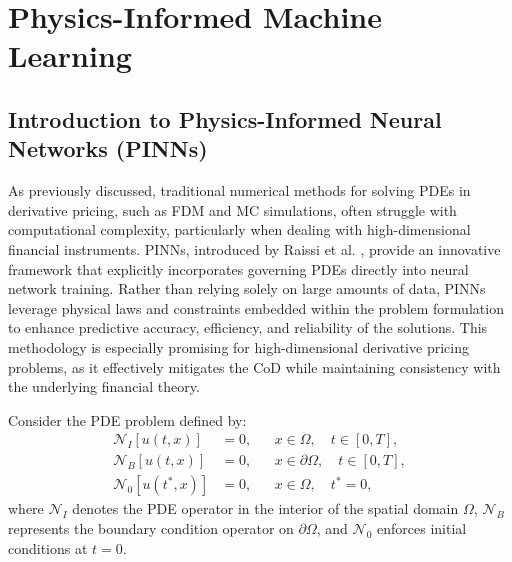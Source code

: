 \documentclass[12pt]{report} %
\theoremstyle{plain}           %
\theoremstyle{definition}      %
\theoremstyle{remark}          %
\begin{document}
	


\chapter{Physics-Informed Machine Learning}

\section{Introduction to Physics-Informed Neural Networks (PINNs)}
As previously discussed, traditional numerical methods for solving PDEs in 
derivative pricing, such as FDM and MC simulations, 
often struggle with computational complexity, particularly when dealing with 
high-dimensional financial instruments. PINNs, introduced by Raissi et al. \cite{RAISSI2019686}, 
provide an innovative framework that explicitly incorporates governing PDEs directly into neural 
network training. Rather than relying solely on large amounts of data, PINNs leverage physical 
laws and constraints embedded within the problem formulation to enhance predictive accuracy, 
efficiency, and reliability of the solutions. This methodology is especially promising for 
high-dimensional derivative pricing problems, as it effectively mitigates the 
CoD while maintaining consistency with the underlying financial theory.

Consider the PDE problem defined by:
\begin{equation}
	\begin{aligned}
	\mathcal{N}_I[u(t,x)] &= 0, && x\in\Omega,\quad t\in [0,T], \\
	\mathcal{N}_B[u(t,x)] &= 0, && x\in\partial\Omega,\quad t\in [0,T], \\
	\mathcal{N}_0[u(t^*,x)] &= 0, && x\in\Omega,\quad t^*=0,
	\end{aligned}
	\label{eq:PDE_conditions}
\end{equation}
where \(\mathcal{N}_I\) denotes the PDE operator in the interior of the spatial 
domain \(\Omega\), \(\mathcal{N}_B\) represents the boundary condition operator 
on \(\partial\Omega\), and \(\mathcal{N}_0\) enforces initial conditions at \(t=0\).
\end{document}
